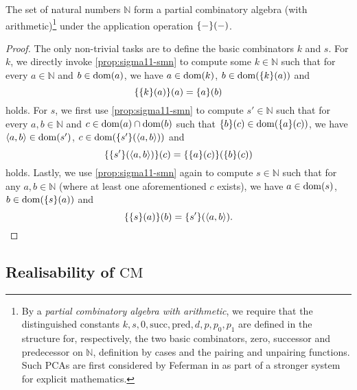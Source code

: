 \documentclass[11pt]{article}
\theoremstyle{plain}
\theoremstyle{definition}
\newcommand{\tuple}[1]{\left\langle #1 \right\rangle}
\DeclareMathOperator{\dom}{dom}
\begin{document}
\begin{corollary}
    \label{cor:sigma11-pca}
    The set of natural numbers $\mathbb{N}$ form a partial combinatory algebra (with arithmetic)\footnote{By a \emph{partial combinatory algebra with arithmetic}, we require that the distinguished constants $k, s, 0, \mathrm{succ}, \mathrm{pred}, d, p, p_0, p_1$ are defined in the structure for, respectively, the two basic combinators, zero, successor and predecessor on $\mathbb{N}$, definition by cases and the pairing and unpairing functions. Such PCAs are first considered by Feferman in \cite{feferman75-em} as part of a stronger system for explicit mathematics.} under the application operation $\mleft\{-\mright\}\mleft(-\mright)$.
\end{corollary}

\begin{proof}
    The only non-trivial tasks are to define the basic combinators $k$ and $s$. For $k$, we directly invoke \autoref{prop:sigma11-smn} to compute some $k \in \mathbb{N}$ such that for every $a \in \mathbb{N}$ and $b \in \dom\mleft(a\mright)$, we have $a \in \dom\mleft(k\mright)$, $b \in \dom\mleft(\mleft\{k\mright\}\mleft(a\mright)\mright)$ and
    \[\mleft\{\mleft\{k\mright\}\mleft(a\mright)\mright\}\mleft(a\mright) = \mleft\{a\mright\}\mleft(b\mright)\]
    holds. For $s$, we first use \autoref{prop:sigma11-smn} to compute $s' \in \mathbb{N}$ such that for every $a, b \in \mathbb{N}$ and $c \in \dom\mleft(a\mright) \cap \dom\mleft(b\mright)$ such that $\mleft\{b\mright\}\mleft(c\mright) \in \dom\mleft(\mleft\{a\mright\}\mleft(c\mright)\mright)$, we have $\tuple{a, b} \in \dom\mleft(s'\mright)$, $c \in \dom\mleft(\mleft\{s'\mright\}\mleft(\tuple{a, b}\mright)\mright)$ and
    \[\mleft\{\mleft\{s'\mright\}\mleft(\tuple{a, b}\mright)\mright\}\mleft(c\mright) = \mleft\{\mleft\{a\mright\}\mleft(c\mright)\mright\}\mleft(\mleft\{b\mright\}\mleft(c\mright)\mright)\]
    holds. Lastly, we use \autoref{prop:sigma11-smn} again to compute $s \in \mathbb{N}$ such that for any $a, b \in \mathbb{N}$ (where at least one aforementioned $c$ exists), we have $a \in \dom\mleft(s\mright)$, $b \in \dom\mleft(\mleft\{s\mright\}\mleft(a\mright)\mright)$ and
    \[\mleft\{\mleft\{s\mright\}\mleft(a\mright)\mright\}\mleft(b\mright) = \mleft\{s'\mright\}\mleft(\tuple{a, b}\mright). \qedhere\]
\end{proof}

\subsection{Realisability of \texorpdfstring{$\mathrm{CM}$}{CM}}
\label{subsec:realisability-cm}
\end{document}
